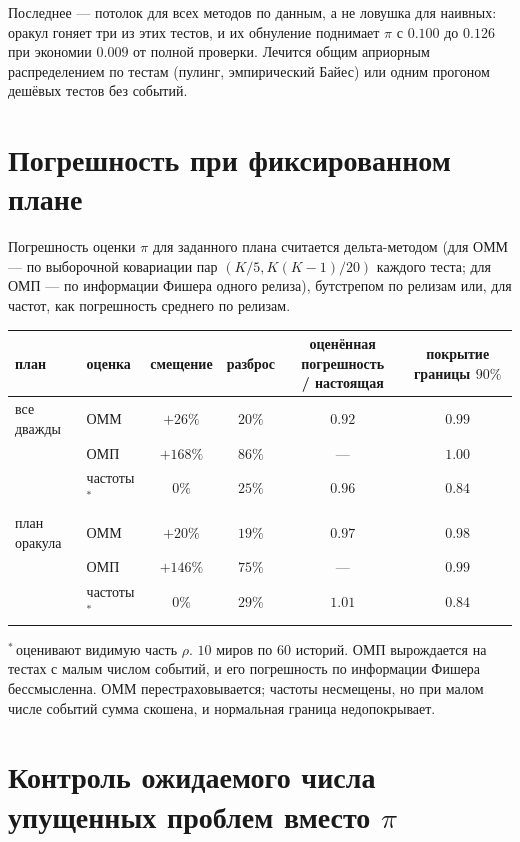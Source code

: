 \documentclass[11pt,a4paper]{article}
\theoremstyle{plain}
\theoremstyle{definition}
\begin{document}
Последнее --- потолок для всех методов по данным, а не ловушка для наивных: оракул гоняет три из этих тестов, и их обнуление поднимает $\pi$ с $0.100$ до $0.126$ при экономии $0.009$ от полной проверки. Лечится общим априорным распределением по тестам (пулинг, эмпирический Байес) или одним прогоном дешёвых тестов без событий.

\section{Погрешность при фиксированном плане}

Погрешность оценки $\pi$ для заданного плана считается дельта-методом (для ОММ --- по выборочной ковариации пар $(K/5,K(K-1)/20)$ каждого теста; для ОМП --- по информации Фишера одного релиза), бутстрепом по релизам или, для частот, как погрешность среднего по релизам.

\begin{center}\small
\begin{tabular}{@{}llcccc@{}}
\toprule
план & оценка & смещение & разброс & \thead{оценённая погрешность\\/ настоящая} & \thead{покрытие\\границы $90\%$} \\
\midrule
все дважды & ОММ & $+26\%$ & $20\%$ & $0.92$ & $0.99$ \\
 & ОМП & $+168\%$ & $86\%$ & --- & $1.00$ \\
 & частоты${}^*$ & $0\%$ & $25\%$ & $0.96$ & $0.84$ \\
план оракула & ОММ & $+20\%$ & $19\%$ & $0.97$ & $0.98$ \\
 & ОМП & $+146\%$ & $75\%$ & --- & $0.99$ \\
 & частоты${}^*$ & $0\%$ & $29\%$ & $1.01$ & $0.84$ \\
\bottomrule
\end{tabular}
\end{center}

${}^*$\,оценивают видимую часть $\rho$. $10$ миров по $60$ историй. ОМП вырождается на тестах с малым числом событий, и его погрешность по информации Фишера бессмысленна. ОММ перестраховывается; частоты несмещены, но при малом числе событий сумма скошена, и нормальная граница недопокрывает.

\section{Контроль ожидаемого числа упущенных проблем вместо $\pi$}
\end{document}
